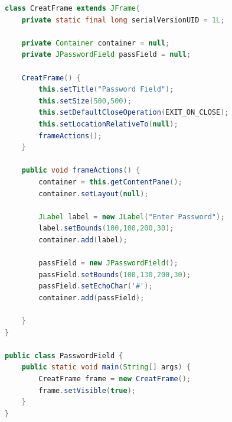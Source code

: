 \begin{frame}

\begin{lstlisting}[language=java]
class CreatFrame extends JFrame{
	private static final long serialVersionUID = 1L;
	
	private Container container = null;
	private JPasswordField passField = null;
	
	CreatFrame() {
		this.setTitle("Password Field");
		this.setSize(500,500);
		this.setDefaultCloseOperation(EXIT_ON_CLOSE);
		this.setLocationRelativeTo(null);
		frameActions();
	}
	
	public void frameActions() {
		container = this.getContentPane();
		container.setLayout(null);
		
		JLabel label = new JLabel("Enter Password");
		label.setBounds(100,100,200,30);
		container.add(label);
		
		passField = new JPasswordField();
		passField.setBounds(100,130,200,30);
		passField.setEchoChar('#');
		container.add(passField);
		
	}
}

public class PasswordField {
	public static void main(String[] args) {
		CreatFrame frame = new CreatFrame();
		frame.setVisible(true);
	}
}
\end{lstlisting}


\end{frame}


\newpage
